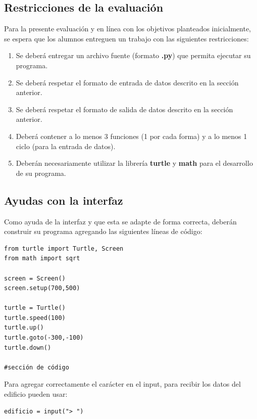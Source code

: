 \documentclass[]{article}
\begin{document}
    \subsection{Restricciones de la evaluación}
    Para la presente evaluación y en línea con los objetivos planteados inicialmente, se espera que los alumnos entreguen un trabajo con las siguientes restricciones:

    \begin{enumerate}
        \item Se deberá entregar un archivo fuente (formato \textbf{.py}) que permita ejecutar su programa.
        \item Se deberá respetar el formato de entrada de datos descrito en la sección anterior.
        \item Se deberá respetar el formato de salida de datos descrito en la sección anterior.
        \item Deberá contener a lo menos 3 funciones (1 por cada forma) y a lo menos 1 ciclo (para la entrada de datos).
        \item Deberán necesariamente utilizar la librería \textbf{turtle} y \textbf{math} para el desarrollo de su programa.
    \end{enumerate}

    \subsection{Ayudas con la interfaz}
    Como ayuda de la interfaz y que esta se adapte de forma correcta, deberán construir su programa agregando las siguientes líneas de código:\\

    \begin{verbatim}
from turtle import Turtle, Screen
from math import sqrt

screen = Screen()
screen.setup(700,500)

turtle = Turtle()
turtle.speed(100)
turtle.up()
turtle.goto(-300,-100)
turtle.down()

#sección de código
    \end{verbatim}

    Para agregar correctamente el carácter en el input, para recibir los datos del edificio pueden usar:\\

    \begin{verbatim}
edificio = input("> ")
    \end{verbatim}
\end{document}
